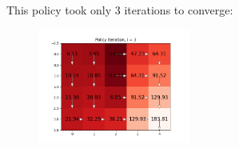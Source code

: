 \documentclass[submit]{harvardml}
\begin{document}
\begin{enumerate}
    This policy took only 3 iterations to converge:
    
    \begin{figure}[H]
        \includegraphics[width=5cm]{hw6/plots/all/Policy_3.png}
        \centering
    \end{figure}
    
\end{enumerate}





\newpage
\end{document}
